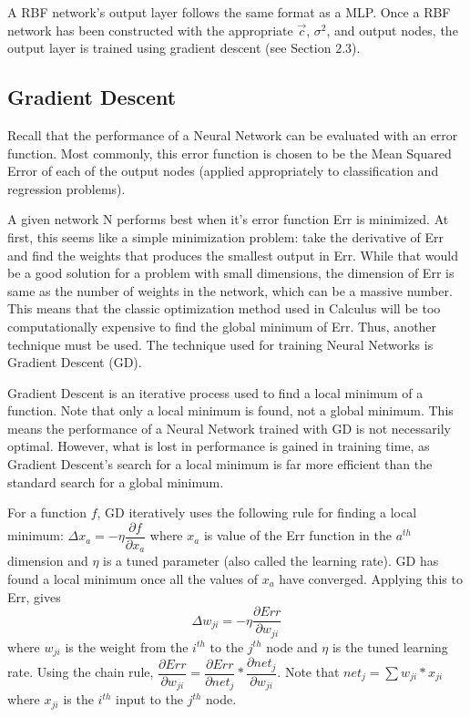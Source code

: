 \documentclass[twoside,10pt]{article}
\begin{document}
	A RBF network's output layer follows the same format as a MLP. Once a RBF network has been constructed with the appropriate $\vec c$, $\sigma^2$, and output nodes, the output layer is trained using gradient descent (see Section 2.3).

\subsection{Gradient Descent}
Recall that the performance of a Neural Network can be evaluated with an error function.
Most commonly, this error function is chosen to be the Mean Squared Error of each of the output nodes (applied appropriately to classification and regression problems).

A given network N performs best when it's error function Err is minimized.
At first, this seems like a simple minimization problem: take the derivative of Err and find the weights that produces the smallest output in Err.
While that would be a good solution for a problem with small dimensions, the dimension of Err is same as the number of weights in the network, which can be a massive number.
This means that the classic optimization method used in Calculus will be too computationally expensive to find the global minimum of Err. Thus, another technique must be used.
The technique used for training Neural Networks is Gradient Descent (GD).

Gradient Descent is an iterative process used to find a local minimum of a function. Note that only a local minimum is found, not a global minimum.
This means the performance of a Neural Network trained with GD is not necessarily optimal.
However, what is lost in performance is gained in training time, as Gradient Descent's search for a local minimum is far more efficient than the standard search for a global minimum.

For a function $f$, GD iteratively uses the following rule for finding a local minimum:
$\Delta x_a = - \eta \dfrac{\partial f}{\partial x_a}$ where $x_a$ is value of the Err function in the $a^{th}$ dimension and $\eta$ is a tuned parameter (also called the learning rate). GD has found a local minimum once all the values of $x_a$ have converged.
Applying this to Err, gives
$$\Delta w_{ji} = - \eta \dfrac{\partial Err}{\partial w_{ji}}$$
where $w_{ji}$ is the weight from the $i^{th}$ to the $j^{th}$ node and $\eta$ is the tuned learning rate. Using the chain rule,
$\dfrac{\partial Err}{\partial w_{ji}} = \dfrac{\partial Err}{\partial net_{j}} * \dfrac{\partial net_j}{\partial w_{ji}}$. Note that $net_j = \sum w_{ji} * x_{ji}$ where $x_{ji}$ is the $i^{th}$ input to the $j^{th}$ node.
\end{document}
